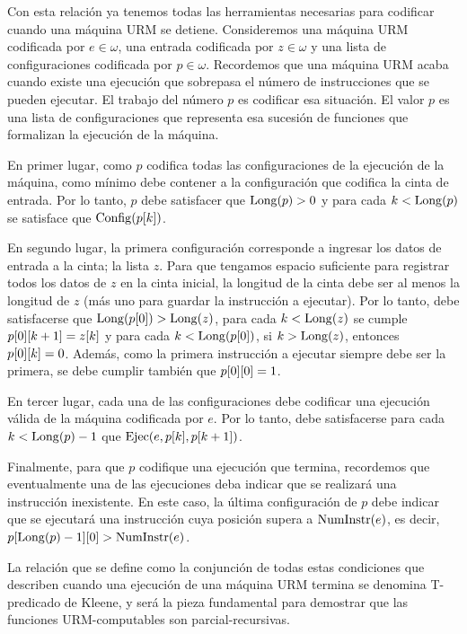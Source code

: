 Con esta relación ya tenemos todas las herramientas necesarias para codificar cuando una máquina URM se detiene. Consideremos una máquina URM codificada por $e\in\omega$, una entrada codificada por $z\in\omega$ y una lista de configuraciones codificada por $p\in\omega$. Recordemos que una máquina URM acaba cuando existe una ejecución que sobrepasa el número de instrucciones que se pueden ejecutar. El trabajo del número $p$ es codificar esa situación. El valor $p$ es una lista de configuraciones que representa esa sucesión de funciones que formalizan la ejecución de la máquina.

En primer lugar, como $p$ codifica todas las configuraciones de la ejecución de la máquina, como mínimo debe contener a la configuración que codifica la cinta de entrada. Por lo tanto, $p$ debe satisfacer que $\LONGITUD\pa*{p} > 0$ y para cada $k <\LONGITUD\pa*{p}$ se satisface que $\CONFIGURACIONES\pa*{p\bra*{k}}$.

En segundo lugar, la primera configuración corresponde a ingresar los datos de entrada a la cinta; la lista $z$. Para que tengamos espacio suficiente para registrar todos los datos de $z$ en la cinta inicial, la longitud de la cinta debe ser al menos la longitud de $z$ (más uno para guardar la instrucción a ejecutar). Por lo tanto, debe satisfacerse que $\LONGITUD\pa*{p\bra*{0}} >\LONGITUD\pa*{z}$, para cada $k <\LONGITUD\pa*{z}$ se cumple $p\bra*{0}\bra*{k + 1} = z\bra*{k}$ y para cada $k <\LONGITUD\pa*{p\bra*{0}}$, si $k >\LONGITUD\pa*{z}$, entonces $p\bra*{0}\bra*{k} = 0$. Además, como la primera instrucción a ejecutar siempre debe ser la primera, se debe cumplir también que $p\bra*{0}\bra*{0} = 1$.

En tercer lugar, cada una de las configuraciones debe codificar una ejecución válida de la máquina codificada por $e$. Por lo tanto, debe satisfacerse para cada $k <\LONGITUD\pa*{p} - 1$ que $\EJECUCION\pa*{e, p\bra*{k}, p\bra*{k + 1}}$.

Finalmente, para que $p$ codifique una ejecución que termina, recordemos que eventualmente una de las ejecuciones deba indicar que se realizará una instrucción inexistente. En este caso, la última configuración de $p$ debe indicar que se ejecutará una instrucción cuya posición supera a $\NUMINSTRUCCIONES\pa*{e}$, es decir, $p\bra*{\LONGITUD\pa*{p} - 1}\bra*{0} >\NUMINSTRUCCIONES\pa*{e}$.

La relación que se define como la conjunción de todas estas condiciones que describen cuando una ejecución de una máquina URM termina se denomina T-predicado de Kleene, y será la pieza fundamental para demostrar que las funciones URM-computables son parcial-recursivas.

